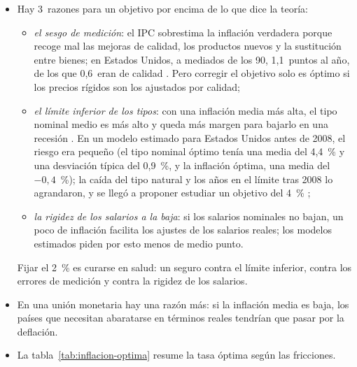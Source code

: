 \documentclass[11pt]{article}
\begin{document}
\begin{itemize}
\item Hay 3~razones para un objetivo por encima de lo que dice la teoría:
  \begin{itemize}
  \item \emph{el sesgo de medición}: el IPC sobrestima la inflación verdadera porque recoge mal las mejoras de calidad, los productos nuevos y la sustitución entre bienes; en Estados Unidos, a mediados de los 90, 1,1~puntos al año, de los que 0,6~eran de calidad\nocite{Boskin1996Toward} . Pero corregir el objetivo solo es óptimo si los precios rígidos son los ajustados por calidad\nocite{SchmittGroheUribe2010Optimal};
  \item \emph{el límite inferior de los tipos}: con una inflación media más alta, el tipo nominal medio es más alto y queda más margen para bajarlo en una recesión . En un modelo estimado para Estados Unidos antes de 2008, el riesgo era pequeño (el tipo nominal óptimo tenía una media del 4,4~\% y una desviación típica del 0,9~\%, y la inflación óptima, una media del $-0{,}4$~\%)\nocite{SchmittGroheUribe2010Optimal}; la caída del tipo natural y los años en el límite tras 2008 lo agrandaron, y se llegó a proponer estudiar un objetivo del 4~\%\nocite{BlanchardDellAricciaMauro2010}  ;
  \item \emph{la rigidez de los salarios a la baja}: si los salarios nominales no bajan, un poco de inflación facilita los ajustes de los salarios reales\nocite{Tobin1972Inflation,AkerlofDickensPerry1996}; los modelos estimados piden por esto menos de medio punto\nocite{SchmittGroheUribe2010Optimal}.
  \end{itemize}
  Fijar el 2~\% es curarse en salud: un seguro contra el límite inferior, contra los errores de medición y contra la rigidez de los salarios.
\item En una unión monetaria hay una razón más: si la inflación media es baja, los países que necesitan abaratarse en términos reales tendrían que pasar por la deflación.
\item La tabla~\ref{tab:inflacion-optima} resume la tasa óptima según las fricciones.

\end{itemize}
\end{document}
